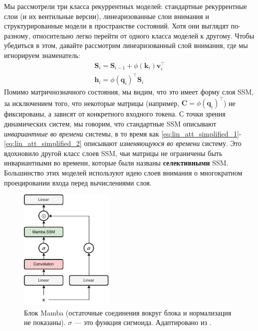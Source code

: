 Мы рассмотрели три класса рекуррентных моделей: стандартные рекуррентные слои (и их вентильные версии), линеаризованные слои внимания и структурированные модели в пространстве состояний. Хотя они выглядят по-разному, относительно легко перейти от одного класса моделей к другому. Чтобы убедиться в этом, давайте рассмотрим линеаризованный слой внимания, где мы игнорируем знаменатель:
%
\begin{align}
\mathbf{S}_i=\mathbf{S}_{i-1}+\phi(\mathbf{k}_i)\mathbf{v}_i^\top \label{eq:lin_att_simplified_1} \\
\mathbf{h}_i=\phi(\mathbf{q}_i)^\top\mathbf{S}_i
\label{eq:lin_att_simplified_2}\end{align}
%
Помимо матричнозначного состояния, мы видим, что это имеет форму слоя SSM, за исключением того, что некоторые матрицы (например, $\mathbf{C} = \phi(\mathbf{q}_i)^\top$) не фиксированы, а зависят от конкретного входного токена. С точки зрения динамических систем, мы говорим, что стандартные SSM описывают \textit{инвариантные во времени} системы, в то время как \eqref{eq:lin_att_simplified_1}-\eqref{eq:lin_att_simplified_2} описывают \textit{изменяющуюся во времени} систему. Это вдохновило другой класс слоев SSM, чьи матрицы не ограничены быть инвариантными во времени, которые были названы \textbf{селективными} SSM. Большинство этих моделей используют идею слоев внимания о многократном проецировании входа перед вычислениями слоя.

\begin{figure}
    \centering
    \hspace{2em}\includegraphics[width=0.4\textwidth]{images/mamba}
    \caption{Блок Mamba (остаточные соединения вокруг блока и нормализация не показаны). $\sigma$ — это функция сигмоида. Адаптировано из \cite{gu2023mamba}.}
    \label{fig:mamba}
\end{figure}

